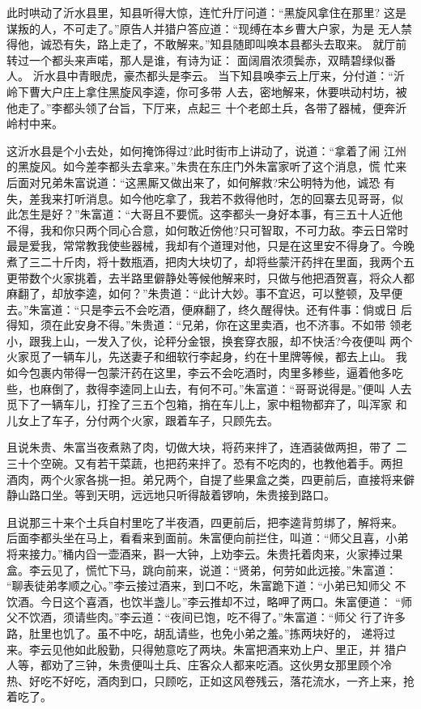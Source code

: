 此时哄动了沂水县里，知县听得大惊，连忙升厅问道：“黑旋风拿住在那里?
这是谋叛的人，不可走了。”原告人并猎户答应道：“现缚在本乡曹大户家，为是
无人禁得他，诚恐有失，路上走了，不敢解来。”知县随即叫唤本县都头去取来。
就厅前转过一个都头来声喏，那人是谁，有诗为证：
面阔眉浓须鬓赤，双睛碧绿似番人。
沂水县中青眼虎，豪杰都头是李云。
当下知县唤李云上厅来，分付道：“沂岭下曹大户庄上拿住黑旋风李逵，你可多带
人去，密地解来，休要哄动村坊，被他走了。”李都头领了台旨，下厅来，点起三
十个老郎土兵，各带了器械，便奔沂岭村中来。

这沂水县是个小去处，如何掩饰得过?此时街市上讲动了，说道：“拿着了闹
江州的黑旋风。如今差李都头去拿来。”朱贵在东庄门外朱富家听了这个消息，慌
忙来后面对兄弟朱富说道：“这黑厮又做出来了，如何解救?宋公明特为他，诚恐
有失，差我来打听消息。如今他吃拿了，我若不救得他时，怎的回寨去见哥哥，似
此怎生是好？”朱富道：“大哥且不要慌。这李都头一身好本事，有三五十人近他
不得，我和你只两个同心合意，如何敢近傍他?只可智取，不可力敌。李云日常时
最是爱我，常常教我使些器械，我却有个道理对他，只是在这里安不得身了。今晚
煮了三二十斤肉，将十数瓶酒，把肉大块切了，却将些蒙汗药拌在里面，我两个五
更带数个火家挑着，去半路里僻静处等候他解来时，只做与他把酒贺喜，将众人都
麻翻了，却放李逵，如何？”朱贵道：“此计大妙。事不宜迟，可以整顿，及早便
去。”朱富道：“只是李云不会吃酒，便麻翻了，终久醒得快。还有件事：倘或日
后得知，须在此安身不得。”朱贵道：“兄弟，你在这里卖酒，也不济事。不如带
领老小，跟我上山，一发入了伙，论秤分金银，换套穿衣服，却不快活?今夜便叫
两个火家觅了一辆车儿，先送妻子和细软行李起身，约在十里牌等候，都去上山。
我如今包裹内带得一包蒙汗药在这里，李云不会吃酒时，肉里多糁些，逼着他多吃
些，也麻倒了，救得李逵同上山去，有何不可。”朱富道：“哥哥说得是。”便叫
人去觅下了一辆车儿，打拴了三五个包箱，捎在车儿上，家中粗物都弃了，叫浑家
和儿女上了车子，分付两个火家，跟着车子，只顾先去。

且说朱贵、朱富当夜煮熟了肉，切做大块，将药来拌了，连酒装做两担，带了
二三十个空碗。又有若干菜蔬，也把药来拌了。恐有不吃肉的，也教他着手。两担
酒肉，两个火家各挑一担。弟兄两个，自提了些果盒之类，四更前后，直接将来僻
静山路口坐。等到天明，远远地只听得敲着锣响，朱贵接到路口。

且说那三十来个土兵自村里吃了半夜酒，四更前后，把李逵背剪绑了，解将来。
后面李都头坐在马上，看看来到面前。朱富便向前拦住，叫道：“师父且喜，小弟
将来接力。”桶内舀一壶酒来，斟一大钟，上劝李云。朱贵托着肉来，火家捧过果
盒。李云见了，慌忙下马，跳向前来，说道：“贤弟，何劳如此远接。”朱富道：
“聊表徒弟孝顺之心。”李云接过酒来，到口不吃，朱富跪下道：“小弟已知师父
不饮酒。今日这个喜酒，也饮半盏儿。”李云推却不过，略呷了两口。朱富便道：
“师父不饮酒，须请些肉。”李云道：“夜间已饱，吃不得了。”朱富道：“师父
行了许多路，肚里也饥了。虽不中吃，胡乱请些，也免小弟之羞。”拣两块好的，
递将过来。李云见他如此殷勤，只得勉意吃了两块。朱富把酒来劝上户、里正，并
猎户人等，都劝了三钟，朱贵便叫土兵、庄客众人都来吃酒。这伙男女那里顾个冷
热、好吃不好吃，酒肉到口，只顾吃，正如这风卷残云，落花流水，一齐上来，抢
着吃了。

